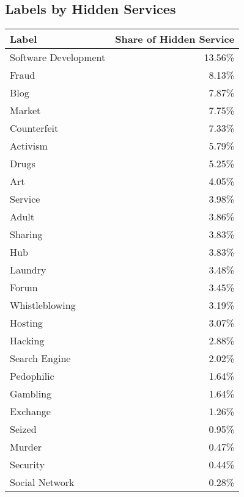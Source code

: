 \subsection{Labels by Hidden Services}
\label{appendix:labelsByHosts}
\ifdgruyter
\begin{center}
    \begin{supertabular}[H]{l|r}
    \textbf{Label}  & \textbf{Share of Hidden Service}\\
    \hline
    \hline
    Software Development	&	13.56\%\\
	\hline
	Fraud		&	8.13\%\\
	\hline
	Blog		&	7.87\%\\
	\hline
	Market		&	7.75\%\\
	\hline
	Counterfeit	&	7.33\%\\
	\hline
	Activism	&	5.79\%\\
	\hline
	Drugs		&	5.25\%\\
	\hline
	Art			&	4.05\%\\
	\hline
	Service		&	3.98\%\\
	\hline
	Adult		&	3.86\%\\
	\hline
	Sharing		&	3.83\%\\
	\hline
	Hub		&	3.83\%\\
	\hline
	Laundry		&	3.48\%\\
	\hline
	Forum		&	3.45\%\\
	\hline
	Whistleblowing			&	3.19\%\\
	\hline
	Hosting		&	3.07\%\\
	\hline
	Hacking		&	2.88\%\\
	\hline
	Search Engine			&	2.02\%\\
	\hline
	Pedophilic	&	1.64\%\\
	\hline
	Gambling	&	1.64\%\\
	\hline
	Exchange	&	1.26\%\\
	\hline
	Seized		&	0.95\%\\
	\hline
	Murder		&	0.47\%\\
	\hline
	Security	&	0.44\%\\
	\hline
	Social Network			&	0.28\%\\
    \end{supertabular}
\end{center}
\fi

